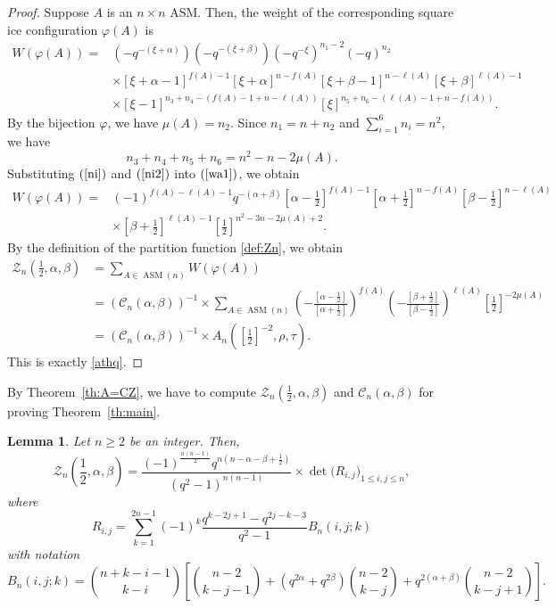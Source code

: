 \documentclass[12pt, a4paper]{amsart} %
\numberwithin{equation}{section}
\newtheorem{lemma}[theorem]{Lemma}
\DeclareMathOperator{\ASM}{ASM}
\begin{document}
\begin{proof}
	Suppose $A$ is an $n\times n$ ASM. Then, the weight of the corresponding square ice configuration $\varphi(A)$ is
\begin{align}\label{wa1}
W(\varphi(A)) =&(-q^{-(\xi+\alpha)})(-q^{-(\xi+\beta)})(-q^{-\xi})^{n_1-2}(-q)^{n_2} \nonumber \\
& \times [\xi+\alpha-1]^{f(A)-1}[\xi+\alpha]^{n-f(A)}[\xi+\beta-1]^{n-\ell(A)}[\xi+\beta]^{\ell(A)-1} \nonumber \\
& \times [\xi-1]^{n_3+n_4-(f(A)-1+n-\ell(A))}[\xi]^{n_5+n_6-(\ell(A)-1+n-f(A))}. 
\end{align}
By the bijection $\varphi$, we have $\mu(A)=n_2$. Since $n_1=n+n_2$ and $\sum_{i=1}^6n_i=n^2$, we have
\begin{equation}\label{ni2}
    n_3+n_4+n_5+n_6=n^2-n-2\mu(A).
\end{equation}
Substituting $(\ref{ni})$ and $(\ref{ni2})$ into $(\ref{wa1})$, we obtain 
\begin{align*}
W(\varphi(A)) 
=& (-1)^{f(A)-\ell(A)-1}q^{-(\alpha+\beta)}[\alpha-\frac{1}{2}]^{f(A)-1}[\alpha+\frac{1}{2}]^{n-f(A)}[\beta-\frac{1}{2}]^{n-\ell(A)} \nonumber \\
& \times [\beta+\frac{1}{2}]^{\ell(A)-1}[\frac{1}{2}]^{n^2-3n-2\mu(A)+2}.
\end{align*} 
By the definition of the partition function \eqref{def:Zn}, we obtain
\begin{align*}
\mathcal{Z}_n(\frac{1}{2}, \alpha, \beta)
	&=\sum_{A \in \ASM(n)} W(\varphi(A))\\
	&=(\mathcal{C}_n(\alpha, \beta))^{-1} \times  \sum_{A \in \ASM(n)} 
( -\frac{[\alpha - \frac{1}{2}]}{[\alpha + \frac{1}{2}]})^{f(A)}
( -\frac{[\beta + \frac{1}{2}]}{[\beta - \frac{1}{2}]} )^{\ell(A)}
[ \frac{1}{2} ]^{-2\mu(A)}\\
	&= (\mathcal{C}_n(\alpha, \beta))^{-1} \times A_n( [ \frac{1}{2} ]^{-2}, \rho, \tau).
\end{align*}
This is exactly \eqref{athq}. 
\end{proof}


By Theorem~\ref{th:A=CZ}, we have to compute $\mathcal{Z}_{n}(\frac{1}{2},\alpha,\beta)$ and $\mathcal{C}_n(\alpha, \beta)$ for proving Theorem~\ref{th:main}. 
\begin{lemma}\label{lem:Zn} 
Let $n\geq 2$ be an integer. 
Then,
\begin{equation}\label{znf12}
	\mathcal{Z}_n(\frac{1}{2}, \alpha, \beta)=\frac{(-1)^{\frac{n(n-1)}{2}}q^{n(n-\alpha-\beta+\frac{1}{2})}}{(q^2-1)^{n(n-1)}}\times \det{\bigl(R_{i,j}\bigr)_{1 \le i,j \le n}},
\end{equation}
where 
$$
R_{i,j}=\sum_{k=1}^{2n-1}(-1)^k\frac{q^{k-2j+1}-q^{2j-k-3}}{q^2-1}B_n(i,j;k)
$$
with notation
$$
	B_n(i,j;k)=\binom{n+k-i-1}{k-i}\left[\binom{n-2}{k-j-1}+(q^{2\alpha}+q^{2\beta})\binom{n-2}{k-j}+ q^{2(\alpha+\beta)} \binom{n-2}{k-j+1}  \right].
$$
\end{lemma}
\end{document}
